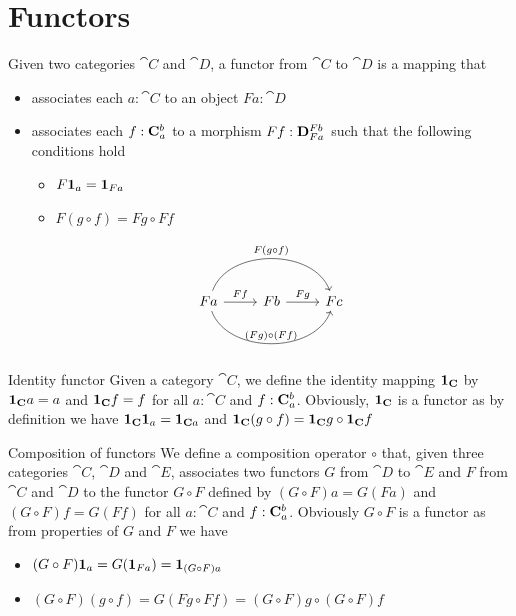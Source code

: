 \documentclass[12pt]{article}
\begin{document}
\section{Functors}

\begin{definition}
    Given two categories \(\cat{C}\) and \(\cat{D}\), a functor from \(\cat{C}\) to \(\cat{D}\) is a mapping that 
    \begin{itemize}
        \item associates each \(a : \cat{C}\) to an object \(F a : \cat{D}\)
        \item associates each \(f : \morphs{C}{a}{b}\) to a morphism \(F f : \morphs{D}{F a}{F b}\)
        such that the following conditions hold 
        \begin{itemize}
            \item \(F \idarrow[a] = \idarrow[F a]\)
            \item \(F (g \circ f) = F g \circ F f\)
        \end{itemize}
        \begin{equation*}
            \begin{tikzcd}
                F a \arrow[r,"F f"]
                    \arrow[rr, bend left=70,"F (g\circ f)"]
                    \arrow[rr, bend right=70,"(F g) \circ (F f)"] 
                &
                F b \arrow[r,"F g"]
                & 
                F c
            \end{tikzcd}
        \end{equation*}
    \end{itemize}
\end{definition}

\begin{paragraph}{Identity functor}
Given a category \(\cat{C}\), we define the identity mapping \(\idarrow[\cat{C}]\) by
\(\idarrow[\cat{C}] a = a\) and \(\idarrow[\cat{C}] f = f\) for all \(a:\cat{C}\)
and \(f:\morphs{C}{a}{b}\). Obviously, \(\idarrow[\cat{C}]\) is a functor
as by definition we have 
\(\idarrow[\cat{C}] \idarrow[a] = \idarrow[\cat{C} a]\) and 
\(\idarrow[\cat{C}] (g \circ f) = \idarrow[\cat{C}]g\circ\idarrow[\cat{C}] f\)
\end{paragraph}
\begin{paragraph}{Composition of functors}
We define a composition operator $\circ$ that, 
given three categories \(\cat{C}\), \(\cat{D}\) and \(\cat{E}\), associates
two functors $G$ from \(\cat{D}\) to \(\cat{E}\) and $F$ from \(\cat{C}\) and \(\cat{D}\) to the functor \(G \circ F\) defined by 
\((G \circ F) a = G (F a)\) and \((G \circ F) f = G (F f)\) for all \(a:\cat{C}\)
and \(f:\morphs{C}{a}{b}\).
Obviously \(G \circ F\) is a functor as from properties of $G$ and $F$ we have
\begin{itemize}
\item \((G \circ F) \idarrow[a] = G(\idarrow[F a]) = \idarrow[(G\circ F)a]\)
\item \((G \circ F)(g \circ f) = 
    G (F g \circ F f) = (G \circ F) g \circ (G \circ F) f\)
\end{itemize}
\end{paragraph}
\end{document}
